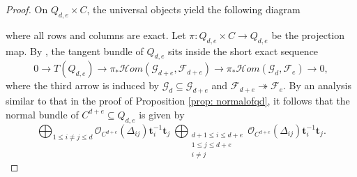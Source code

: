 \documentclass[10pt]{amsart}
\newcommand{\CO}{\mathcal{O}}
\newcommand{\CH}{\mathcal{H}}
\newcommand{\CF}{\mathcal{F}}
\newcommand{\CG}{\mathcal{G}}
\newcommand{\bt}{\mathbf{t}}
\newcommand{\+}{{}^+}
\theoremstyle{definition}
\theoremstyle {definition}
\theoremstyle {definition}
\begin{document}
\begin{proof}

On $Q_{d,e}\times C$, the universal objects yield the following diagram
\begin{center}
\end{center}
where all rows and columns are exact. Let $\pi:Q_{d,e}\times C\rightarrow Q_{d,e}$ be the projection map. By \cite[Prop. 1.10]{Minets}, the tangent bundle of $Q_{d,e}$ sits inside the short exact sequence
$$0\rightarrow T(Q_{d,e})\rightarrow \pi_*\CH om(\CG_{d+e}, \CF_{d+e})\rightarrow \pi_*\CH om(\CG_d,\CF_e)\rightarrow 0,
$$
where the third arrow is induced by $\CG_d\subseteq \CG_{d+e}$ and $\CF_{d+e}\twoheadrightarrow \CF_e$. By an analysis similar to that in the proof of Proposition \ref{prop: normalofqd}, it follows that the normal bundle of $C^{d+e} \subseteq Q_{d,e}$ is given by 
\begin{equation}\label{eq: normal of Q_d,e}
    \bigoplus_{1 \leq i \neq j \leq d} \mathcal{O}_{C^{d+e}}(\Delta_{ij})\bt_{i}^{-1}\bt_{j} \ 
\bigoplus_{\substack{d+1 \leq i \leq d+e \\ 1 \leq j \leq d+e\\ i\neq j}} \mathcal{O}_{C^{d+e}}(\Delta_{ij}) \bt_{i}^{-1}\bt_{j}.
\end{equation}



\end{proof}
\end{document}
